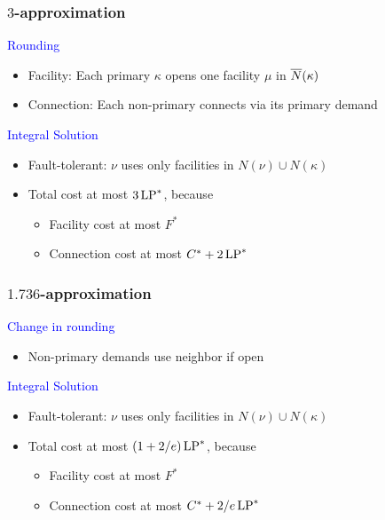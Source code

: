 \documentclass[handout, hyperref, dvipsnames]{beamer}
\begin{document}
\begin{frame}
  \frametitle{$3$-approximation}

  {\Large \textcolor{blue}{
  Rounding}}

  \begin{itemize}
  \item Facility: Each primary $\kappa$ opens one facility $\mu$ in ${\overline{N}}(\kappa)$
  \item Connection: Each non-primary connects via its primary demand
  \end{itemize}

  \vspace{.3in}
  {\Large \textcolor{blue}{
  Integral Solution}}

  \begin{itemize}
  \item Fault-tolerant: $\nu$ uses only facilities in
    $N(\nu) \cup N(\kappa)$
  \item Total cost at most $3\,\mbox{\rm LP}^\ast$, because
    \begin{itemize}
    \item Facility cost at most $F^\ast$
    \item Connection cost at most $C^\ast + 2\,\mbox{\rm LP}^\ast$
    \end{itemize}
  \end{itemize}

\end{frame}

\begin{frame}
  \frametitle{$1.736$-approximation} 

  {\Large \textcolor{blue}{
  Change in rounding}}
  \begin{itemize}
  \item Non-primary demands use neighbor if open
  \end{itemize}

  \vspace{.3in}
  {\Large \textcolor{blue}{
  Integral Solution}}
  \begin{itemize}
  \item Fault-tolerant: $\nu$ uses only facilities in
    $N(\nu) \cup N(\kappa)$
  \item Total cost at most $(1+2/e)\,\mbox{\rm LP}^\ast$, because
    \begin{itemize}
    \item Facility cost at most $F^\ast$
    \item Connection cost at most $C^\ast + 2/e\, \mbox{\rm LP}^\ast$
    \end{itemize}
  \end{itemize}
\end{frame}
\end{document}
